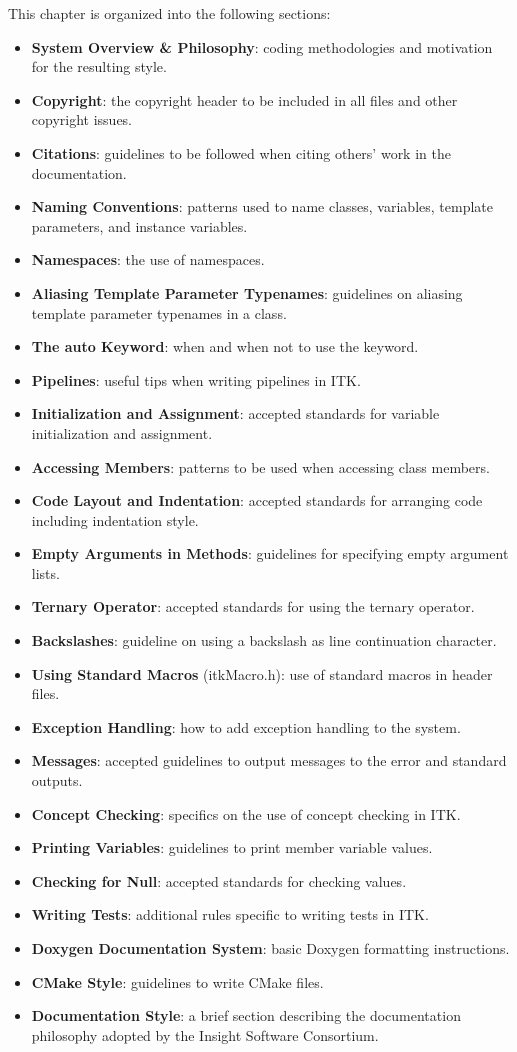 This chapter is organized into the following sections:
\begin{itemize}
\item \textbf{System Overview \& Philosophy}: coding methodologies and
motivation for the resulting style.
\item \textbf{Copyright}: the copyright header to be included in all files and
other copyright issues.
\item \textbf{Citations}: guidelines to be followed when citing others' work in
the documentation.
\item \textbf{Naming Conventions}: patterns used to name classes, variables,
template parameters, and instance variables.
\item \textbf{Namespaces}: the use of namespaces.
\item \textbf{Aliasing Template Parameter Typenames}: guidelines on aliasing
template parameter typenames in a class.
\item \textbf{The auto Keyword}: when and when not to use the 
keyword.
\item \textbf{Pipelines}: useful tips when writing pipelines in ITK.
\item \textbf{Initialization and Assignment}: accepted standards for variable
initialization and assignment.
\item \textbf{Accessing Members}: patterns to be used when accessing class
members.
\item \textbf{Code Layout and Indentation}: accepted standards for arranging
code including indentation style.
\item \textbf{Empty Arguments in Methods}: guidelines for specifying empty
argument lists.
\item \textbf{Ternary Operator}: accepted standards for using the ternary
operator.
\item \textbf{Backslashes}: guideline on using a backslash as line continuation
character.
\item \textbf{Using Standard Macros} (itkMacro.h): use of standard macros in
header files.
\item \textbf{Exception Handling}: how to add exception handling to the system.
\item \textbf{Messages}: accepted guidelines to output messages to the error
and standard outputs.
\item \textbf{Concept Checking}: specifics on the use of concept checking in
ITK.
\item \textbf{Printing Variables}: guidelines to print member variable values.
\item \textbf{Checking for Null}: accepted standards for checking 
values.
\item \textbf{Writing Tests}: additional rules specific to writing tests in ITK.
\item \textbf{Doxygen Documentation System}: basic Doxygen formatting
instructions.
\item \textbf{CMake Style}: guidelines to write CMake files.
\item \textbf{Documentation Style}: a brief section describing the
documentation philosophy adopted by the Insight Software Consortium.
\end{itemize}

